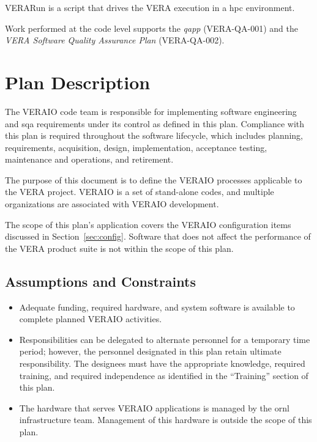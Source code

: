 \documentclass{vera-ornltm}
\begin{document}
VERARun is a script that drives the VERA execution in a \ac{hpc} environment.

Work performed at the code level supports the {\it\ac{qapp}} (VERA-QA-001) and the {\it VERA Software Quality Assurance Plan} (VERA-QA-002).


\section{Plan Description}

The VERAIO code team is responsible for implementing software engineering and \ac{sqa} requirements under its control as defined in this plan.
Compliance with this plan is required throughout the software lifecycle, which includes planning, requirements, acquisition, design, implementation, acceptance testing, maintenance and operations, and retirement.

The purpose of this document is to define the VERAIO processes applicable to the VERA project.
VERAIO is a set of stand-alone codes, and multiple organizations are associated with VERAIO development.


The scope of this plan's application covers the VERAIO configuration items discussed in Section~\ref{sec:config}.
Software that does not affect the performance of the VERA product suite is not within the scope of this plan.

\subsection{Assumptions and Constraints}

\begin{itemize}
\item{Adequate funding, required hardware, and system software is available to complete planned VERAIO activities.}
\item{Responsibilities can be delegated to alternate personnel for a temporary time period; however, the personnel designated in this plan retain ultimate responsibility.
The designees must have the appropriate knowledge, required training, and required independence as identified in the ``Training'' section of this plan.}
\item{The hardware that serves VERAIO applications is managed by the \ac{ornl} infrastructure team.
Management of this hardware is outside the scope of this plan.}
\end{itemize}
\end{document}
